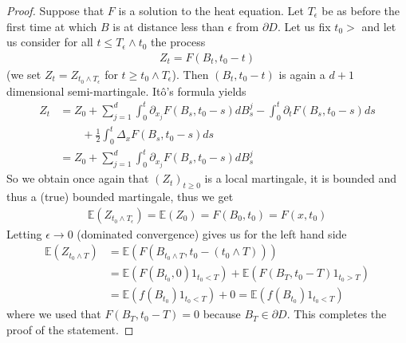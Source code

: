 \documentclass[../mainfile.tex]{subfiles}
\begin{document}
 \begin{proof}
 Suppose that $F$ is a solution to the heat equation. Let $T_\epsilon$ be as before the first time at which $B$ is at distance less than $\epsilon$ from $\partial D$. Let us fix $t_0 >$ and let us consider for all $t \leq T_\epsilon \wedge t_0$ the process 
\begin{align*}
Z_t=F(B_t,t_0-t)
\end{align*}
(we set $Z_t= Z_{t_0 \wedge T_\epsilon}$ for $t \geq t_0 \wedge T_\epsilon$). Then $(B_t,t_0-t)$ is again a $d+1$ dimensional semi-martingale. Itô's formula yields
\begin{align*}
Z_t&=Z_0 + \sum_{j=1}^d \int_0^t \partial_{x_j} F(B_s,t_0-s) dB_s^j - \int_0^t \partial_t F(B_s,t_0-s)ds \\  & \qquad + \frac{1}{2} \int_0^t \Delta_x F(B_s,t_0-s)ds \\
& = Z_0 + \sum_{j=1}^d \int_0^t \partial_{x_j} F(B_s,t_0-s) dB_s^j
\end{align*}
\newpage
So we obtain once again that $(Z_t)_{t \geq 0}$ is a local martingale, it is bounded and thus a (true) bounded martingale, thus we get
\begin{align*}
\mathbb{E}(Z_{t_0 \wedge T_\epsilon})= \mathbb{E}(Z_0)= F(B_0,t_0)=F(x,t_0)
\end{align*}
Letting $\epsilon \to 0$ (dominated convergence) gives us for the left hand side
\begin{align*}
\mathbb{E}(Z_{t_0 \wedge T}) &=\mathbb{E}(F(B_{t_0 \wedge T}, t_0-(t_0 \wedge T))) \\
& = \mathbb{E}(F(B_{t_0},0) 1_{t_0 < T}) + \mathbb{E}(F(B_T,t_0-T) 1_{t_0 >T}) \\ 
&= \mathbb{E}(f(B_{t_0})1_{t_0 < T}) +0 = \mathbb{E}(f(B_{t_0})1_{t_0 < T})
\end{align*}
where we used that $F(B_T,t_0-T)=0$ because $B_T \in \partial D$. This completes the proof of the statement.
 \end{proof}
\end{document}
